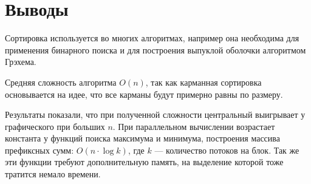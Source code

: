 \section{Выводы}
Сортировка используется во многих алгоритмах, например она необходима для применения бинарного поиска и для построения выпуклой оболочки алгоритмом Грэхема.

Средняя сложность алгоритма $O(n)$, так как карманная сортировка основывается на идее, что все карманы будут примерно равны по размеру.

Результаты показали, что при полученной сложности центральный выигрывает у графического при больших $n$. При параллельном вычислении возрастает константа у функций поиска максимума и минимума, построения массива префиксных сумм: $O(n \cdot \log{k})$, где $k$ --- количество потоков на блок. Так же эти функции требуют дополнительную память, на выделение которой тоже тратится немало времени.
\pagebreak
